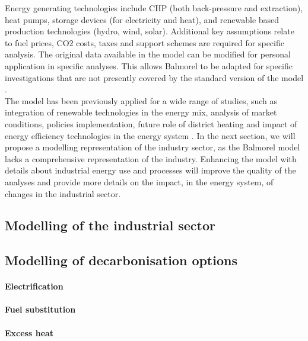 \documentclass[review]{elsarticle}
\begin{document}
Energy generating technologies include CHP (both back-pressure and extraction), heat pumps, storage devices (for electricity and heat), and renewable based production technologies (hydro, wind, solar).
Additional key assumptions relate to fuel prices, CO2 costs, taxes and support schemes are required for specific analysis.
The original data available in the model can be modified for personal application in specific analyses. This allows Balmorel to be adapted for specific investigations that are not presently covered by the standard version of the model \cite{Wiese}.
\\
The model has been previously applied for a wide range of studies, such as integration of renewable technologies in the energy mix, analysis of market conditions, policies implementation, future role of district heating and impact of energy efficiency technologies in the energy system \cite{Ball2007,Jensen2008,Karlsson2008,Munster2012,Munster2010,Baldini2016a}.
In the next section, we will propose a modelling representation of the industry sector, as the Balmorel model lacks a comprehensive representation of the industry. Enhancing the model with details about industrial energy use and processes will improve the quality of the analyses and provide more details on the impact, in the energy system, of changes in the industrial sector.

\subsection{Modelling of the industrial sector}

\subsection{Modelling of decarbonisation options}

\paragraph{Electrification}

\paragraph{Fuel substitution}

\paragraph{Excess heat}
\end{document}

